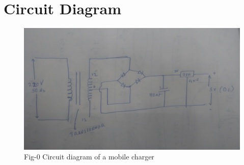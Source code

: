 \documentclass[journal,12pt,twocolumn]{IEEEtran}
\numberwithin{figure}{section}
\begin{document}
	\section{Circuit Diagram}
	\begin{figure}[!ht]
		\centering
		\includegraphics[width=\columnwidth]{./figs/circuit.jpg}
		\caption*{Fig-0 Circuit diagram of a mobile charger}
		\label{fig-ckt}	
	\end{figure}
	
\end{document}
